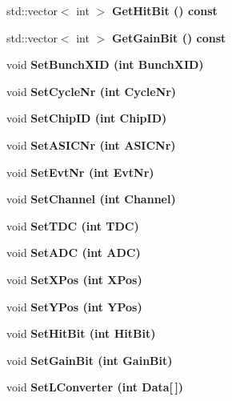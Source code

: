 \begin{CompactItemize}
\item 
std::vector$<$ int $>$ \bf{Get\-Hit\-Bit} () const \label{classLConverter_a474380139f77c6bdd0b8b7e567a945d}

\item 
std::vector$<$ int $>$ \bf{Get\-Gain\-Bit} () const \label{classLConverter_7b487e854e021067fc88f09983d5e123}

\item 
void \bf{Set\-Bunch\-XID} (int Bunch\-XID)\label{classLConverter_70167d213985829b9fd6ca4462356745}

\item 
void \bf{Set\-Cycle\-Nr} (int Cycle\-Nr)\label{classLConverter_56b4c819796df3b277d0fca449e5b5ac}

\item 
void \bf{Set\-Chip\-ID} (int Chip\-ID)\label{classLConverter_0bf6679e157343a0b83746497e1ccf00}

\item 
void \bf{Set\-ASICNr} (int ASICNr)\label{classLConverter_84e953955928c18a2916c4b35fc1bb3c}

\item 
void \bf{Set\-Evt\-Nr} (int Evt\-Nr)\label{classLConverter_5bbce60484309c2addfb0d3419dacfac}

\item 
void \bf{Set\-Channel} (int Channel)\label{classLConverter_ef8dfa5cc73346e909f1cf43b4be67fc}

\item 
void \bf{Set\-TDC} (int TDC)\label{classLConverter_6eca998701d5b2969aeb41d4d1b9862d}

\item 
void \bf{Set\-ADC} (int ADC)\label{classLConverter_071c269731b600e118aa5f9a0743f313}

\item 
void \bf{Set\-XPos} (int XPos)\label{classLConverter_041faf6f76b51159efb25a023b3fd38c}

\item 
void \bf{Set\-YPos} (int YPos)\label{classLConverter_83701b0dbb9a9e68b11497199594e895}

\item 
void \bf{Set\-Hit\-Bit} (int Hit\-Bit)\label{classLConverter_b7a5423503edcdfedd3ed347b2d4cd0b}

\item 
void \bf{Set\-Gain\-Bit} (int Gain\-Bit)\label{classLConverter_230e9e60779ff27f6447ed2c981e68b6}

\item 
void \bf{Set\-LConverter} (int Data[$\,$])\label{classLConverter_06f64ec78238053906a7c06434273a70}


\end{CompactItemize}
